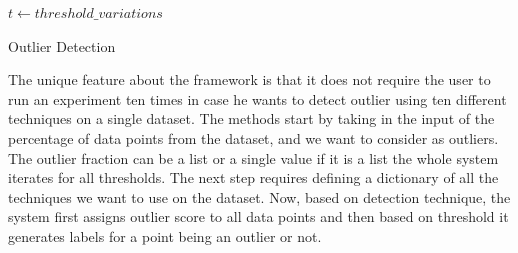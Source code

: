 \documentclass[runningheads]{llncs}
\begin{document}
\begin{algorithm}[H]
\SetAlgoLined

 \STATE $t\gets threshold\_variations$
 
 
 \While{$t\neq empty$}{
  \STATE $outlier\_fraction\gets t.head(1)$
  
  \STATE $classifiers\gets \{ \\
     abod: angle\_based\_outlier\_detection \\
     cblof: cluseter\_based\_outlier\_detection \\
        ... \\
  \}$
  
  \For{$cls\_name, $cls\_object in classifiers$ $}    {
      
       
          
          \STATE $X\_train \gets dataset$ \\
          \STATE $cls\_object.fit(X\_train)$
          
          \STATE  $scores\_pred \gets cls\_object.decision\_function(X\_train)*-1$ \\
          \STATE $y\_pred \gets cls\_object.predict(X\_train)$
          
          \STATE $outliers \gets scores\_pred.head(outlier\_fraction)$
          
          \STATE $dataset\_new \gets X\_train.drop(outliers)$
          
          \STATE $result \gets crossValidate(dataset\_new, parameters)$
          
          \STATE $y\_pred \gets xgboost.predict(dataset\_new)$
   }                
   \EndFor
 }
 \caption{Outlier Detection}
\end{algorithm}

The unique feature about the framework is that it does not require the user to run an experiment ten times in case he wants to detect outlier using ten different techniques on a single dataset. The methods start by taking in the input of the percentage of data points from the dataset, and we want to consider as outliers. The outlier fraction can be a list or a single value if it is a list the whole system iterates for all thresholds. The next step requires defining a dictionary of all the techniques we want to use on the dataset. Now, based on detection technique, the system first assigns outlier score to all data points and then based on threshold it generates labels for a point being an outlier or not.
\end{document}
